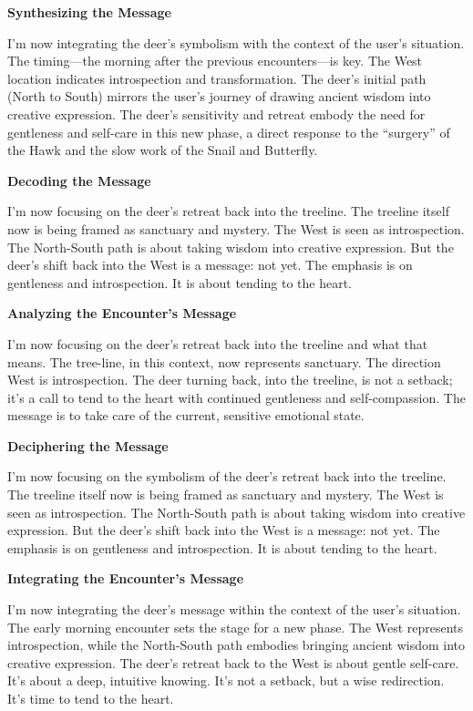 \documentclass{article}
\begin{document}
\textbf{Synthesizing the Message}

I'm now integrating the deer's symbolism with the context of the user's situation. The timing---the morning after the previous encounters---is key. The West location indicates introspection and transformation. The deer's initial path (North to South) mirrors the user's journey of drawing ancient wisdom into creative expression. The deer's sensitivity and retreat embody the need for gentleness and self-care in this new phase, a direct response to the ``surgery'' of the Hawk and the slow work of the Snail and Butterfly.

\textbf{Decoding the Message}

I'm now focusing on the deer's retreat back into the treeline. The treeline itself now is being framed as sanctuary and mystery. The West is seen as introspection. The North-South path is about taking wisdom into creative expression. But the deer's shift back into the West is a message: not yet. The emphasis is on gentleness and introspection. It is about tending to the heart.

\textbf{Analyzing the Encounter's Message}

I'm now focusing on the deer's retreat back into the treeline and what that means. The tree-line, in this context, now represents sanctuary. The direction West is introspection. The deer turning back, into the treeline, is not a setback; it's a call to tend to the heart with continued gentleness and self-compassion. The message is to take care of the current, sensitive emotional state.

\textbf{Deciphering the Message}

I'm now focusing on the symbolism of the deer's retreat back into the treeline. The treeline itself now is being framed as sanctuary and mystery. The West is seen as introspection. The North-South path is about taking wisdom into creative expression. But the deer's shift back into the West is a message: not yet. The emphasis is on gentleness and introspection. It is about tending to the heart.

\textbf{Integrating the Encounter's Message}

I'm now integrating the deer's message within the context of the user's situation. The early morning encounter sets the stage for a new phase. The West represents introspection, while the North-South path embodies bringing ancient wisdom into creative expression. The deer's retreat back to the West is about gentle self-care. It's about a deep, intuitive knowing. It's not a setback, but a wise redirection. It's time to tend to the heart.
\end{document}
